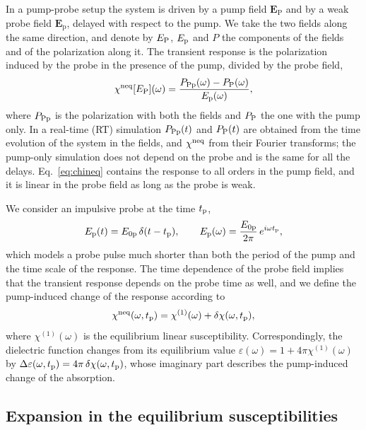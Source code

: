 \documentclass[aps,prb,reprint,superscriptaddress,amsmath,amssymb]{revtex4-2}
\begin{document}
In a pump-probe setup the system is driven by a pump field $\bm{E}_{\mathrm{P}}$ and by a weak probe field
$\bm{E}_{\mathrm{p}}$, delayed with respect to the pump. We take the two fields along the same direction, and denote by
$E_{\mathrm{P}}$, $E_{\mathrm{p}}$ and $P$ the components of the fields and of the polarization along it. The transient response is the
polarization induced by the probe in the presence of the pump, divided by the probe field,
\begin{equation}
\chi^{\mathrm{neq}}[E_{\mathrm{P}}](\omega) = \frac{P_{\mathrm{Pp}}(\omega)-P_{\mathrm{P}}(\omega)}{E_{\mathrm{p}}(\omega)} ,
\label{eq:chineq}
\end{equation}
where $P_{\mathrm{Pp}}$ is the polarization with both the fields and $P_{\mathrm{P}}$ the one with the pump only. In a real-time (RT)
simulation $P_{\mathrm{Pp}}(t)$ and $P_{\mathrm{P}}(t)$ are obtained from the time evolution of the system in the fields, and
$\chi^{\mathrm{neq}}$ from their Fourier transforms; the pump-only simulation does not depend on the probe and is the same for
all the delays. Eq.~\eqref{eq:chineq} contains the response to all orders in the pump field, and it is linear in the
probe field as long as the probe is weak.

We consider an impulsive probe at the time $t_{\mathrm{p}}$,
\begin{equation}
E_{\mathrm{p}}(t) = E_{0\mathrm{p}}\,\delta(t-t_{\mathrm{p}}) , \qquad
E_{\mathrm{p}}(\omega) = \frac{E_{0\mathrm{p}}}{2\pi}\,e^{i\omega t_{\mathrm{p}}} ,
\label{eq:delta_probe}
\end{equation}
which models a probe pulse much shorter than both the period of the pump and the time scale of the response.
The time dependence of the probe field implies that the transient response depends on the probe time as well,
and we define the pump-induced change of the response according to
\begin{equation}
\chi^{\mathrm{neq}}(\omega,t_{\mathrm{p}}) = \chi^{(1)}(\omega) + \delta\chi(\omega,t_{\mathrm{p}}) ,
\label{eq:chineq_split}
\end{equation}
where $\chi^{(1)}(\omega)$ is the equilibrium linear susceptibility. Correspondingly, the dielectric function changes
from its equilibrium value $\varepsilon(\omega) = 1+4\pi\chi^{(1)}(\omega)$ by
$\Delta\varepsilon(\omega,t_{\mathrm{p}}) = 4\pi\,\delta\chi(\omega,t_{\mathrm{p}})$, whose imaginary part describes the pump-induced change of the
absorption.

\subsection{Expansion in the equilibrium susceptibilities}
\label{sec:theory_expansion}
\end{document}
